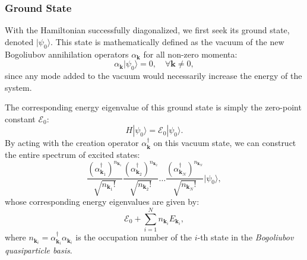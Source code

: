 \subsubsection{Ground State}

With the Hamiltonian successfully diagonalized, we first seek its ground state, denoted \( |\psi_0\rangle \). This state is mathematically defined as the vacuum of the new Bogoliubov annihilation operators \( \alpha_{\mathbf{k}} \) for all non-zero momenta:
\[
    \alpha_{\mathbf{k}} |\psi_0\rangle = 0, \quad \forall \mathbf{k} \neq 0,
\]
since any mode added to the vacuum would necessarily increase the energy of the system.

The corresponding energy eigenvalue of this ground state is simply the zero-point constant \( \mathcal{E}_0 \):
\[
    H |\psi_0\rangle = \mathcal{E}_0 |\psi_0\rangle.
\]
By acting with the creation operator \( \alpha_{\mathbf{k}}^\dagger \) on this vacuum state, we can construct the entire spectrum of excited states:
\[
    \frac{(\alpha_{\mathbf{k}_1}^\dagger)^{n_{\mathbf{k}_1}}}{\sqrt{n_{\mathbf{k}_1}!}} \frac{(\alpha_{\mathbf{k}_2}^\dagger)^{n_{\mathbf{k}_2}}}{\sqrt{n_{\mathbf{k}_2}!}} \dots \frac{(\alpha_{\mathbf{k}_N}^\dagger)^{n_{\mathbf{k}_N}}}{\sqrt{n_{\mathbf{k}_N}!}} |\psi_0\rangle,
\]
whose corresponding energy eigenvalues are given by:
\[
    \mathcal{E}_0 + \sum_{i=1}^N n_{\mathbf{k}_i} E_{\mathbf{k}_i},
\]
where \( n_{\mathbf{k}_i} = \alpha_{\mathbf{k}_i}^\dagger \alpha_{\mathbf{k}_i} \) is the occupation number of the \( i \)-th state in the \textit{Bogoliubov quasiparticle basis}.

